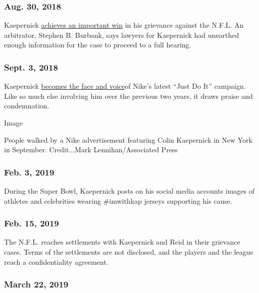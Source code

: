 \hypertarget{aug-30-2018}{%
\subsubsection{Aug. 30, 2018}\label{aug-30-2018}}

Kaepernick
\href{https://www.nytimes.com/2018/08/30/sports/colin-kaepernick-collusion-case-nfl.html?module=inline}{achieves
an important win} in his grievance against the N.F.L. An arbitrator,
Stephen B. Burbank, says lawyers for Kaepernick had unearthed enough
information for the case to proceed to a full hearing.

\hypertarget{sept-3-2018}{%
\subsubsection{\texorpdfstring{\textbf{Sept. 3,
2018}}{Sept. 3, 2018}}\label{sept-3-2018}}

Kaepernick
\href{https://www.nytimes.com/2018/09/03/sports/kaepernick-nike.html}{becomes
the face and voice}of Nike's latest ``Just Do It'' campaign. Like so
much else involving him over the previous two years, it draws praise and
condemnation.

Image

People walked by a Nike advertisement featuring Colin Kaepernick in New
York in September. Credit...Mark Lennihan/Associated Press

\hypertarget{feb-3-2019}{%
\subsubsection{Feb. 3, 2019}\label{feb-3-2019}}

During the Super Bowl, Kaepernick posts on his social media accounts
images of athletes and celebrities wearing \#imwithkap jerseys
supporting his cause.

\hypertarget{feb-15-2019}{%
\subsubsection{Feb. 15, 2019}\label{feb-15-2019}}

The N.F.L. reaches settlements with Kaepernick and Reid in their
grievance cases. Terms of the settlements are not disclosed, and the
players and the league reach a confidentiality agreement.

\hypertarget{march-22-2019}{%
\subsubsection{March 22, 2019}\label{march-22-2019}}

